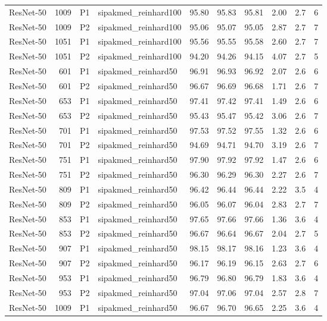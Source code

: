 {\begin{longtable}{lrllrrrrrr}
ResNet-50 & 1009 & P1 & sipakmed\_reinhard100 & 95.80 & 95.83 & 95.81 & 2.00 & 2.7 & 6 \\
ResNet-50 & 1009 & P2 & sipakmed\_reinhard100 & 95.06 & 95.07 & 95.05 & 2.87 & 2.7 & 7 \\
ResNet-50 & 1051 & P1 & sipakmed\_reinhard100 & 95.56 & 95.55 & 95.58 & 2.60 & 2.7 & 7 \\
ResNet-50 & 1051 & P2 & sipakmed\_reinhard100 & 94.20 & 94.26 & 94.15 & 4.07 & 2.7 & 5 \\
ResNet-50 & 601 & P1 & sipakmed\_reinhard50 & 96.91 & 96.93 & 96.92 & 2.07 & 2.6 & 6 \\
ResNet-50 & 601 & P2 & sipakmed\_reinhard50 & 96.67 & 96.69 & 96.68 & 1.71 & 2.6 & 7 \\
ResNet-50 & 653 & P1 & sipakmed\_reinhard50 & 97.41 & 97.42 & 97.41 & 1.49 & 2.6 & 6 \\
ResNet-50 & 653 & P2 & sipakmed\_reinhard50 & 95.43 & 95.47 & 95.42 & 3.06 & 2.6 & 7 \\
ResNet-50 & 701 & P1 & sipakmed\_reinhard50 & 97.53 & 97.52 & 97.55 & 1.32 & 2.6 & 6 \\
ResNet-50 & 701 & P2 & sipakmed\_reinhard50 & 94.69 & 94.71 & 94.70 & 3.19 & 2.6 & 7 \\
ResNet-50 & 751 & P1 & sipakmed\_reinhard50 & 97.90 & 97.92 & 97.92 & 1.47 & 2.6 & 6 \\
ResNet-50 & 751 & P2 & sipakmed\_reinhard50 & 96.30 & 96.29 & 96.30 & 2.27 & 2.6 & 7 \\
ResNet-50 & 809 & P1 & sipakmed\_reinhard50 & 96.42 & 96.44 & 96.44 & 2.22 & 3.5 & 4 \\
ResNet-50 & 809 & P2 & sipakmed\_reinhard50 & 96.05 & 96.07 & 96.04 & 2.83 & 2.7 & 7 \\
ResNet-50 & 853 & P1 & sipakmed\_reinhard50 & 97.65 & 97.66 & 97.66 & 1.36 & 3.6 & 4 \\
ResNet-50 & 853 & P2 & sipakmed\_reinhard50 & 96.67 & 96.64 & 96.67 & 2.04 & 2.7 & 5 \\
ResNet-50 & 907 & P1 & sipakmed\_reinhard50 & 98.15 & 98.17 & 98.16 & 1.23 & 3.6 & 4 \\
ResNet-50 & 907 & P2 & sipakmed\_reinhard50 & 96.17 & 96.19 & 96.15 & 2.63 & 2.7 & 6 \\
ResNet-50 & 953 & P1 & sipakmed\_reinhard50 & 96.79 & 96.80 & 96.79 & 1.83 & 3.6 & 4 \\
ResNet-50 & 953 & P2 & sipakmed\_reinhard50 & 97.04 & 97.06 & 97.04 & 2.57 & 2.8 & 7 \\
ResNet-50 & 1009 & P1 & sipakmed\_reinhard50 & 96.67 & 96.70 & 96.65 & 2.25 & 3.6 & 4 \\

\end{longtable}}

